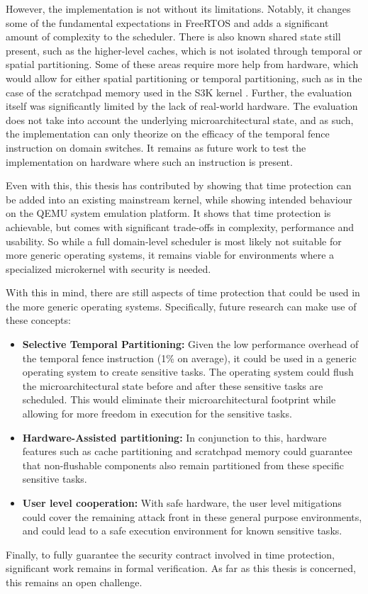 However, the implementation is not without its limitations. Notably, it changes
some of the fundamental expectations in FreeRTOS and adds a significant amount
of complexity to the scheduler. There is also known shared state still present,
such as the higher-level caches, which is not isolated through temporal or
spatial partitioning. Some of these areas require more help from hardware,
which would allow for either spatial partitioning or temporal partitioning,
such as in the case of the scratchpad memory used in the S3K kernel
\cite{karlsson2025}. Further, the evaluation itself was significantly limited
by the lack of real-world hardware. The evaluation does not take into account
the underlying microarchitectural state, and as such, the implementation can
only theorize on the efficacy of the temporal fence instruction on domain
switches. It remains as future work to test the implementation on hardware
where such an instruction is present.

Even with this, this thesis has contributed by showing that time protection can
be added into an existing mainstream kernel, while showing intended behaviour
on the QEMU system emulation platform. It shows that time protection is
achievable, but comes with significant trade-offs in complexity, performance
and usability. So while a full domain-level scheduler is most likely not
suitable for more generic operating systems, it remains viable for environments
where a specialized microkernel with security is needed. 

With this in mind, there are still aspects of time protection that could be
used in the more generic operating systems. Specifically, future research can
make use of these concepts:

\begin{itemize}
  \item \textbf{Selective Temporal Partitioning: }Given the low performance
    overhead of the temporal fence instruction (1\% on average), it could be
    used in a generic operating system to create sensitive tasks. The operating
    system could flush the microarchitectural state before and after these
    sensitive tasks are scheduled. This would eliminate their
    microarchitectural footprint while allowing for more freedom in execution
    for the sensitive tasks.
  \item \textbf{Hardware-Assisted partitioning: } In conjunction to this,
    hardware features such as cache partitioning and scratchpad memory could
    guarantee that non-flushable components also remain partitioned from these
    specific sensitive tasks.
  \item \textbf{User level cooperation: } With safe hardware, the user level
    mitigations could cover the remaining attack front in these general purpose
    environments, and could lead to a safe execution environment for known
    sensitive tasks.
\end{itemize}

Finally, to fully guarantee the security contract involved in time protection,
significant work remains in formal verification. As far as this thesis is
concerned, this remains an open challenge.
